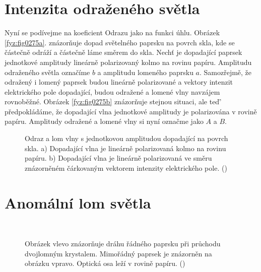   \section{Intenzita odraženého světla}\label{fyz:IchapXXXIIIsecVI}
    Nyní se podívejme na koeﬁcient Odrazu jako na funkci úhlu. Obrázek \ref{fyz:fig0275a}. znázorňuje
    dopad světelného paprsku na povrch skla, kde se částečně odráží a částečně láme směrem do skla.
    Nechť je dopadající paprsek jednotkové amplitudy lineárně polarizovaný kolmo na rovinu papíru.
    Amplitudu odraženého světla označíme \(b\) a amplitudu lomeného paprsku \(a\). Samozřejmě, že
    odražený i lomený paprsek budou lineárně polarizované a vektory intenzit elektrického pole
    dopadající, budou odražené a lomené vlny navzájem rovnoběžné. Obrázek \ref{fyz:fig0275b}
    znázorňuje stejnou situaci, ale teď' předpokládáme, že dopadající vlna jednotkové amplitudy je
    polarizována v rovině papíru. Amplitudy odražené a lomené vlny si nyní označme jako \(A\) a
    \(B\).
  
    \begin{figure}[ht!]  %
      \centering
      \caption{Odraz a lom vlny s jednotkovou amplitudou dopadající na povrch skla. a) Dopadající
              vlna je lineárně polarizovaná kolmo na rovinu papíru. b) Dopadající vlna je lineárně
              polarizovaná ve směru znázorněném čárkovaným vektorem intenzity elektrického pole.      
              (\cite[s.~437]{Feynman01})}
      \label{fyz:fig0275}
    \end{figure}

  \section{Anomální lom světla}\label{fyz:IchapXXXIIIsecVIII}

    \begin{figure}[ht!]  %
      \centering
       \\
      \caption{Obrázek vlevo znázorňuje dráhu řádného paprsku při průchodu dvojlomným krystalem.
              Mimořádný paprsek je znázorněn na obrázku vpravo. Optická osa leží v rovině papíru.
              (\cite[s.~437]{Feynman01})}
      \label{fyz:fig0276}
    \end{figure}

